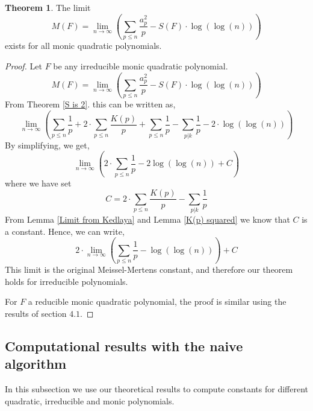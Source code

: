 \documentclass{article}
\theoremstyle{definition}
\newtheorem{theorem}{Theorem}[section]
\theoremstyle{remark}
\begin{document}
\begin{theorem}
The limit
$$M(F) = \lim_{n\rightarrow\infty}\left(\sum_{p\leq n}\frac{a_p^2}{p} - S(F)\cdot \log(\log(n)) \right)$$
exists for all monic quadratic polynomials.
\end{theorem}
\begin{proof}
Let $F$ be any irreducible monic quadratic polynomial.
$$M(F) = \lim_{n\rightarrow\infty}\left(\sum_{p\leq n}\frac{a_p^2}{p} - S(F)\cdot \log(\log(n)) \right)$$
From Theorem \ref{S is 2}. this can be written as,
$$\lim_{n\rightarrow\infty}\left(\sum_{p\leq n}\frac{1}{p}+2\cdot \sum_{p \leq n}\frac{K(p)}{p}+\sum_{p \leq n}\frac{1}{p} - \sum_{p\vert k}\frac{1}{p} - 2\cdot \log(\log(n)) \right)$$
By simplifying, we get,
$$\lim_{n \rightarrow \infty}\left(2\cdot \sum_{p \leq n}\frac{1}{p}-2\log(\log(n))+C\right)$$
where we have set
$$C=2\cdot \sum_{p \leq n}\frac{K(p)}{p}- \sum_{p\vert k}\frac{1}{p}$$
From Lemma \ref{Limit from Kedlaya} and Lemma \ref{K(p) squared} we know that $C$ is a constant. Hence, we can write,
$$2\cdot \lim_{n \rightarrow \infty}\left(\sum_{p \leq n}\frac{1}{p}-\log(\log(n))\right)+C$$
This limit is the original Meissel-Mertens constant, and therefore our theorem holds for irreducible polynomials.

For $F$ a reducible monic quadratic polynomial, the proof is similar using the results of section $4.1$.
\end{proof}

\subsection{Computational results with the naive algorithm}
In this subsection we use our theoretical results to compute constants for different quadratic, irreducible and monic polynomials.
\end{document}
